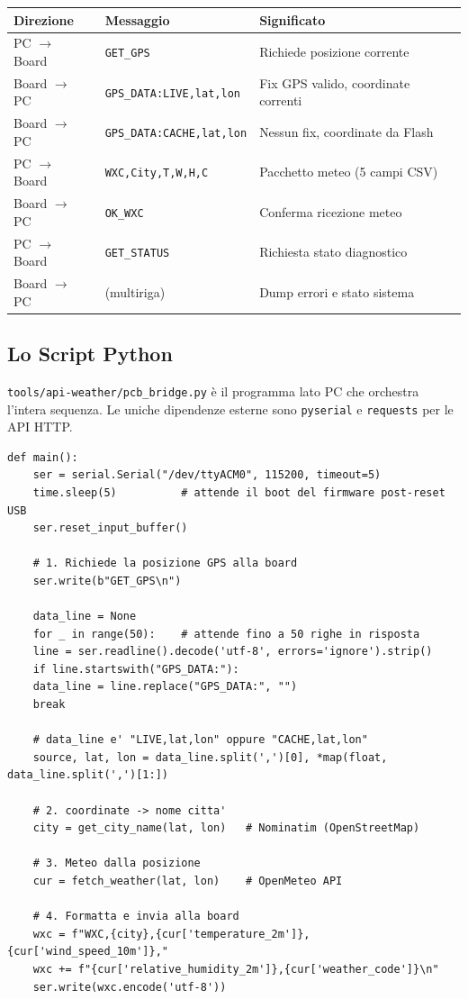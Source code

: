 \begin{tabularx}{\textwidth}{@{}l l X@{}}
	\toprule
	\textbf{Direzione} & \textbf{Messaggio} & \textbf{Significato} \\
	\midrule
	PC $\to$ Board & \texttt{GET\_GPS} & Richiede posizione corrente \\
	Board $\to$ PC & \texttt{GPS\_DATA:LIVE,lat,lon} & Fix GPS valido, coordinate correnti \\
	Board $\to$ PC & \texttt{GPS\_DATA:CACHE,lat,lon} & Nessun fix, coordinate da Flash \\
	PC $\to$ Board & \texttt{WXC,City,T,W,H,C} & Pacchetto meteo (5 campi CSV) \\
	Board $\to$ PC & \texttt{OK\_WXC} & Conferma ricezione meteo \\
	PC $\to$ Board & \texttt{GET\_STATUS} & Richiesta stato diagnostico \\
	Board $\to$ PC & (multiriga) & Dump errori e stato sistema \\
	\bottomrule
\end{tabularx}


\subsection{Lo Script Python}

\texttt{tools/api-weather/pcb\_bridge.py} è il programma lato PC che
orchestra l'intera sequenza. Le uniche dipendenze esterne sono \texttt{pyserial} e \texttt{requests} per le API HTTP.

\begin{lstlisting}[style=py, caption={pcb\_bridge.py --- flusso principale}]
	def main():
	ser = serial.Serial("/dev/ttyACM0", 115200, timeout=5)
	time.sleep(5)          # attende il boot del firmware post-reset USB
	ser.reset_input_buffer()
	
	# 1. Richiede la posizione GPS alla board
	ser.write(b"GET_GPS\n")
	
	data_line = None
	for _ in range(50):    # attende fino a 50 righe in risposta
	line = ser.readline().decode('utf-8', errors='ignore').strip()
	if line.startswith("GPS_DATA:"):
	data_line = line.replace("GPS_DATA:", "")
	break
	
	# data_line e' "LIVE,lat,lon" oppure "CACHE,lat,lon"
	source, lat, lon = data_line.split(',')[0], *map(float, data_line.split(',')[1:])
	
	# 2. coordinate -> nome citta'
	city = get_city_name(lat, lon)   # Nominatim (OpenStreetMap)
	
	# 3. Meteo dalla posizione
	cur = fetch_weather(lat, lon)    # OpenMeteo API
	
	# 4. Formatta e invia alla board
	wxc = f"WXC,{city},{cur['temperature_2m']},{cur['wind_speed_10m']},"
	wxc += f"{cur['relative_humidity_2m']},{cur['weather_code']}\n"
	ser.write(wxc.encode('utf-8'))
\end{lstlisting}

